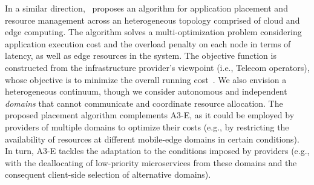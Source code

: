 

In a similar direction,~\cite{Tarneberg2017} proposes an algorithm for application placement and resource management across an heterogeneous topology comprised of cloud and edge computing. 
The algorithm solves a multi-optimization problem considering application
execution cost and the overload penalty on each node in terms of latency, as well as edge resources in the system. The objective function is constructed from the infrastructure provider's viewpoint (i.e., Telecom operators), whose objective is to minimize the overall running cost~\cite{weber2017facilitating}. We also envision a heterogeneous continuum, though we consider autonomous and independent \textit{domains} that cannot communicate and coordinate resource allocation. The proposed placement algorithm complements A3-E, as it could be employed by providers of multiple domains to optimize their costs (e.g., by restricting the availability of resources at different mobile-edge domains in certain conditions). In turn, A3-E tackles the adaptation to the conditions imposed by providers (e.g., with the deallocating of low-priority microservices from these domains and the consequent client-side selection of alternative domains).

